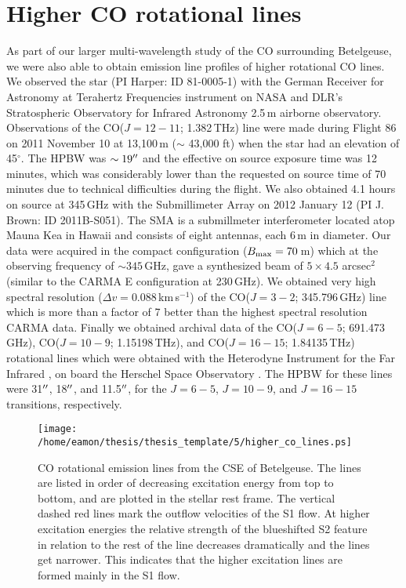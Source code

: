 \section{Higher CO rotational lines}\label{sec:5.10}
As part of our larger multi-wavelength study of the CO surrounding Betelgeuse, we were also able to obtain emission line profiles of higher rotational CO lines. We observed the star (PI Harper: ID 81-0005-1) with the German Receiver for Astronomy at Terahertz Frequencies \cite[GREAT;][]{guesten_2000} instrument on NASA and DLR's Stratospheric Observatory for Infrared Astronomy \cite[SOFIA;][]{becklin_2009} 2.5\,m airborne observatory. Observations of the  CO($J = 12-11$; 1.382\,THz) line were made during Flight 86 on 2011 November 10 at 13,100\,m ($\sim$ 43,000 ft) when the star had an elevation of 45$^{\circ}$. The HPBW was $\sim 19^{\prime\prime}$ and the effective on source exposure time was 12 minutes, which was considerably lower than the requested on source time of 70 minutes due to technical difficulties during the flight. We also obtained 4.1 hours on source at 345\,GHz with the Submillimeter Array \cite[SMA;][]{blundell_2007} on 2012 January 12 (PI J. Brown: ID 2011B-S051). The SMA is a submillmeter interferometer located  atop Mauna Kea in Hawaii and consists of eight antennas, each 6\,m in diameter. Our data were acquired in the compact configuration ($B_{\rm{max}}=70$\,m) which at the observing frequency of $\sim 345$\,GHz, gave a synthesized beam of $5\times 4.5$ arcsec$^2$ (similar to the CARMA E configuration at 230\,GHz). We obtained very high spectral resolution ($\Delta v= 0.088$\,km\,s$^{-1}$) of the CO($J = 3-2$; 345.796\,GHz) line which is more than a factor of 7 better than the highest spectral resolution CARMA data. Finally we obtained archival data of the CO($J = 6-5$; 691.473\,GHz), CO($J = 10-9$; 1.15198\,THz), and CO($J = 16-15$; 1.84135\,THz) rotational lines which were obtained with the Heterodyne Instrument for the Far Infrared \cite[HIFI;][]{deGraauw_2010}, on board the Herschel Space Observatory \citep{pilbratt_2010}. The HPBW for these lines were 31$^{\prime\prime}$, 18$^{\prime\prime}$, and 11.5$^{\prime\prime}$, for the $J=6-5$, $J=10-9$, and $J=16-15$ transitions, respectively.

\begin{figure}[p]
\centering 
\texttt{[image: /home/eamon/thesis/thesis\_template/5/higher\_co\_lines.ps]}
\caption[CO rotational emission lines from the CSE of Betelgeuse]{CO rotational emission lines from the CSE of Betelgeuse. The lines are listed in order of decreasing excitation energy from top to bottom, and are plotted in the stellar rest frame. The vertical dashed red lines mark the outflow velocities of the S1 flow. At higher excitation energies the relative strength of the blueshifted S2 feature in relation to the rest of the line decreases dramatically and the lines get narrower. This indicates that the higher excitation lines are formed mainly in the S1 flow.}
\label{fig:5.12}
\end{figure}

